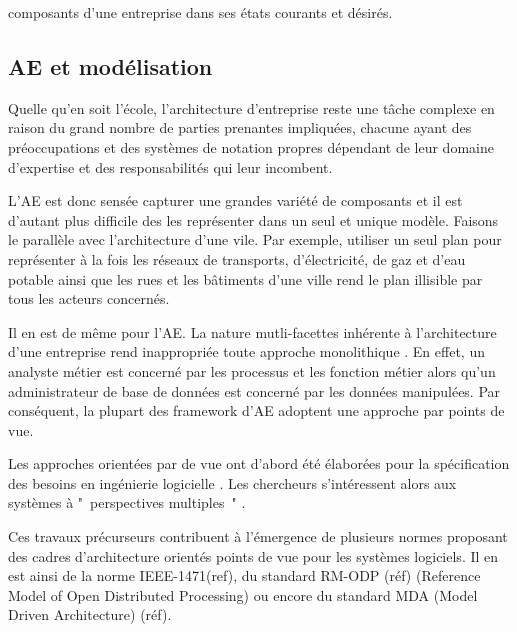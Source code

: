 composants d'une entreprise dans ses états courants et désirés.  

\subsection{AE et modélisation}

Quelle qu'en soit l'école, l'architecture d'entreprise reste une tâche complexe 
\cite{steen2004supporting} en raison du grand nombre de parties prenantes 
impliquées, chacune ayant des préoccupations et des systèmes de notation propres 
dépendant de leur domaine d'expertise et des responsabilités qui leur incombent.

L'AE est donc sensée capturer une grandes variété de composants et il est 
d'autant plus difficile des les représenter dans un seul et unique modèle. 
Faisons le parallèle avec l'architecture d'une vile. Par exemple, utiliser un 
seul plan pour représenter à la fois les réseaux de transports, d'électricité, 
de gaz et d'eau potable ainsi que les rues et les bâtiments d'une ville rend le 
plan illisible par tous les acteurs concernés.

Il en est de même pour l'AE. La nature mutli-facettes inhérente à l'architecture 
d'une entreprise rend inappropriée toute approche monolithique 
\cite{armour1999bigpicture}. En effet, un analyste métier est concerné par les 
processus et les fonction métier alors qu'un administrateur de base de données 
est concerné par les données manipulées. Par conséquent, la plupart des 
framework d'AE adoptent une approche par points de vue.

Les approches orientées par de vue ont d'abord été élaborées pour la 
spécification des besoins en ingénierie logicielle \cite{mullery1979core}. Les 
chercheurs s'intéressent alors aux systèmes à "~perspectives multiples~" 
\cite{finkelstein1992viewpoints} \cite{kotonya1996requirements} 
\cite{nuseibeh1994multi} \cite{meyers1993representing}. 

Ces travaux précurseurs contribuent à l'émergence de plusieurs normes proposant 
des cadres d'architecture orientés points de vue pour les systèmes logiciels. Il 
en est ainsi de la norme IEEE-1471(ref), du standard RM-ODP (réf) (Reference 
Model of Open Distributed Processing) ou encore du standard MDA (Model Driven 
Architecture) (réf).

